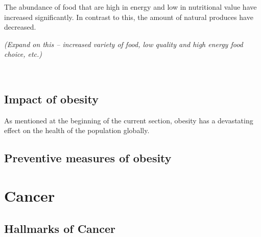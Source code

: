 The abundance of food that are high in energy and low in nutritional value have increased significantly.
In contrast to this, the amount of  natural produces have decreased.



\textit{(Expand on this -- increased variety of food, low quality and high energy food choice, etc.)}


\citep{Malik2013}
\\


\subsection{Impact of obesity}
\label{sub:impact_of_obesity}

As mentioned at the beginning of the current section, obesity has a devastating effect on the health of the population globally.


\citep{Malik2013, Franks2010}




\subsection{Preventive measures of obesity}
\label{sub:preventive_measures_of_obesity}

\citep{Malik2013}




\section{Cancer}
\label{sec:cancer}


\subsection{Hallmarks of Cancer}
\label{subsec:cancerhallmarks}




